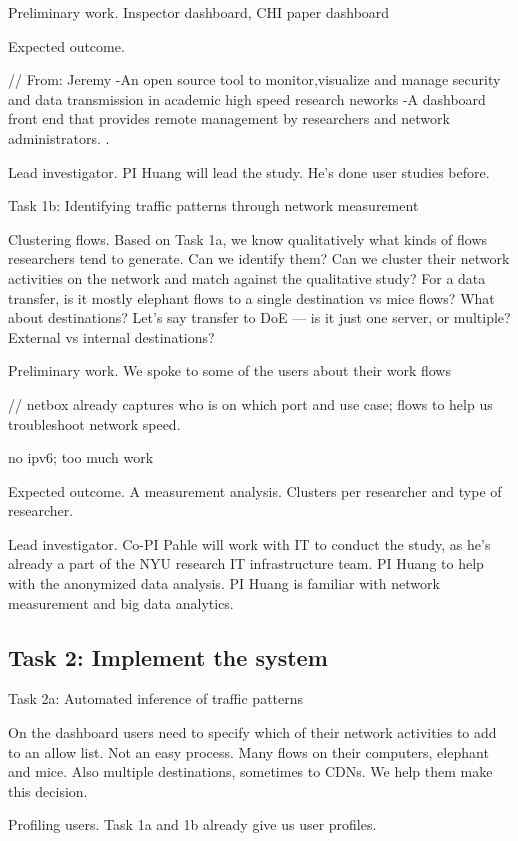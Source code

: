 Preliminary work. Inspector dashboard, CHI paper dashboard

Expected outcome.

// From: Jeremy
-An open source tool to monitor,visualize and manage security and data transmission in academic high speed research neworks
-A dashboard front end that  provides remote management by researchers and network administrators. .

Lead investigator. PI Huang will lead the study. He’s done user studies before.

Task 1b: Identifying traffic patterns through network measurement

Clustering flows. Based on Task 1a, we know qualitatively what kinds of flows researchers tend to generate. Can we identify them? Can we cluster their network activities on the network and match against the qualitative study? For a data transfer, is it mostly elephant flows to a single destination vs mice flows? What about destinations? Let’s say transfer to DoE — is it just one server, or multiple? External vs internal destinations?

Preliminary work. We spoke to some of the users about their work flows

// netbox already captures who is on which port and use case; flows to help us troubleshoot network speed.

no ipv6; too much work


Expected outcome. A measurement analysis. Clusters per researcher and type of researcher.

Lead investigator. Co-PI Pahle will work with IT to conduct the study, as he’s already a part of the NYU research IT infrastructure team. PI Huang to help with the anonymized data analysis. PI Huang is familiar with network measurement and big data analytics.

\subsection{Task 2: Implement the system }

Task 2a: Automated inference of traffic patterns

On the dashboard users need to specify which of their network activities to add to an allow list. Not an easy process. Many flows on their computers, elephant and mice. Also multiple destinations, sometimes to CDNs. We help them make this decision.

Profiling users. Task 1a and 1b already give us user profiles.

